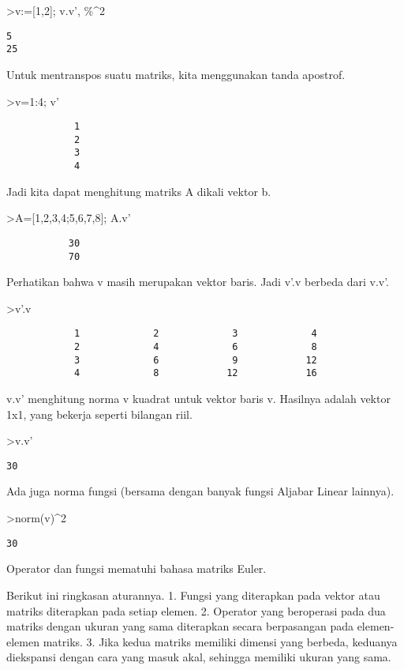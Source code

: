 \documentclass[
]{book}
\begin{document}
\textgreater v:={[}1,2{]}; v.v', \%\^{}2

\begin{verbatim}
5
25
\end{verbatim}

Untuk mentranspos suatu matriks, kita menggunakan tanda apostrof.

\textgreater v=1:4; v'

\begin{verbatim}
            1 
            2 
            3 
            4 
\end{verbatim}

Jadi kita dapat menghitung matriks A dikali vektor b.

\textgreater A={[}1,2,3,4;5,6,7,8{]}; A.v'

\begin{verbatim}
           30 
           70 
\end{verbatim}

Perhatikan bahwa v masih merupakan vektor baris. Jadi v'.v berbeda dari v.v'.

\textgreater v'.v

\begin{verbatim}
            1             2             3             4 
            2             4             6             8 
            3             6             9            12 
            4             8            12            16 
\end{verbatim}

v.v' menghitung norma v kuadrat untuk vektor baris v. Hasilnya adalah vektor 1x1, yang bekerja seperti bilangan riil.

\textgreater v.v'

\begin{verbatim}
30
\end{verbatim}

Ada juga norma fungsi (bersama dengan banyak fungsi Aljabar Linear lainnya).

\textgreater norm(v)\^{}2

\begin{verbatim}
30
\end{verbatim}

Operator dan fungsi mematuhi bahasa matriks Euler.

Berikut ini ringkasan aturannya. 1. Fungsi yang diterapkan pada vektor atau matriks diterapkan pada setiap elemen. 2. Operator yang beroperasi pada dua matriks dengan ukuran yang sama diterapkan secara berpasangan pada elemen-elemen matriks. 3. Jika kedua matriks memiliki dimensi yang berbeda, keduanya diekspansi dengan cara yang masuk akal, sehingga memiliki ukuran yang sama.
\end{document}
